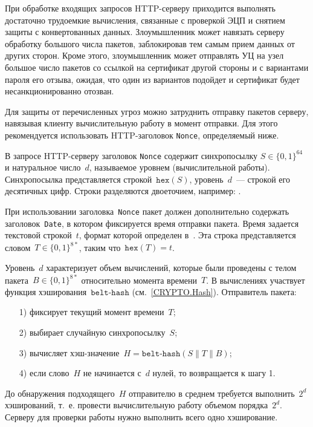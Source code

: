 При обработке входящих запросов HTTP-серверу приходится выполнять 
достаточно трудоемкие вычисления, связанные с проверкой ЭЦП и снятием 
защиты с конвертованных данных.
%
Злоумышленник может навязать серверу обработку большого числа пакетов, 
заблокировав тем самым прием данных от других сторон. 
%
Кроме этого, злоумышленник может отправлять УЦ на узел~
большое число пакетов со ссылкой на сертификат другой стороны и с вариантами 
пароля его отзыва, ожидая, что один из вариантов подойдет и сертификат 
будет несанкционированно отозван.

Для защиты от перечисленных угроз можно затруднить отправку пакетов 
серверу, навязывая клиенту вычислительную работу в момент отправки.
Для этого рекомендуется использовать HTTP-заголовок \texttt{Nonce}, 
определяемый ниже.

В запросе HTTP-серверу заголовок \texttt{Nonce} содержит синхропосылку 
$S\in\{0,1\}^{64}$ и натуральное число~$d$, называемое уровнем 
(вычислительной работы).
%
Синхропосылка представляется строкой~$\texttt{hex}(S)$, уровень~$d$~--- 
строкой его десятичных цифр. Строки разделяются двоеточием,
например: .

При использовании заголовка~\texttt{Nonce} пакет должен дополнительно
содержать заголовок~\texttt{Date}, в котором фиксируется время отправки 
пакета. Время задается текстовой строкой~$t$, формат которой определен 
в~\cite{HTTP}. Эта строка представляется словом~$T\in\{0,1\}^{8*}$, 
таким что~$\texttt{hex}(T)=t$.

Уровень~$d$ характеризует объем вычислений, которые были проведены
с телом пакета~$B\in\{0,1\}^{8*}$ относительно момента времени~$T$.
%
В вычислениях участвует функция хэширования~$\texttt{belt-hash}$
(см.~\ref{CRYPTO.Hash}). Отправитель пакета:
\begin{enumerate}
\item[1)]
фиксирует текущий момент времени~$T$;
\item[2)]
выбирает случайную синхропосылку~$S$;
\item[3)]
вычисляет хэш-значение~$H=\texttt{belt-hash}(S\parallel T\parallel B)$;
\item[4)]
если слово~$H$ не начинается с~$d$ нулей, то возвращается к шагу 1.
\end{enumerate}

До обнаружения подходящего~$H$ отправителю в среднем требуется 
выполнить~$2^d$ хэширований, т.~е. провести вычислительную работу объемом  
порядка~$2^d$. Серверу для проверки работы нужно выполнить всего одно
хэширование.

